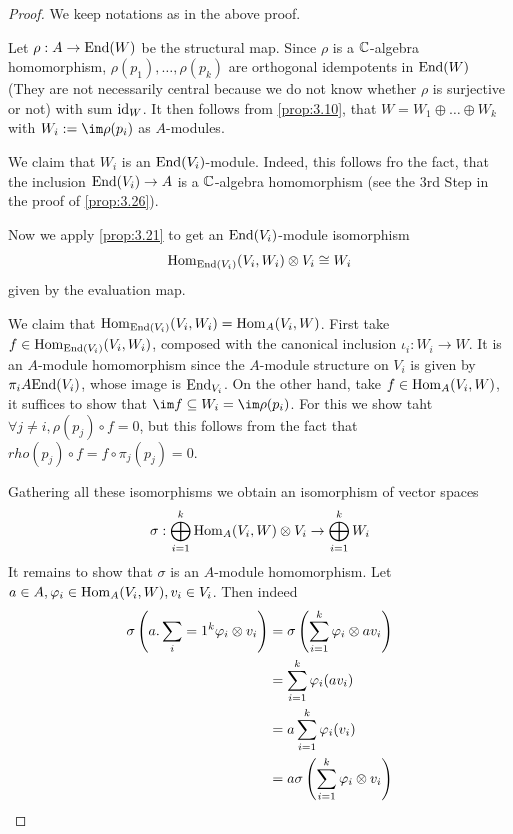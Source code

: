 \documentclass[twoside = false,	%
		headsepline,		%
		parskip = true,
		]{scrbook}						%
\begin{document}
        \begin{proof}
            We keep notations as in the above proof.

            Let $\rho:A\to\mathrm{End}(W)$ be the structural map. Since $\rho$ is a $\mathbb C$-algebra homomorphism, $\rho(p_1), \dots, \rho(p_k)$ are orthogonal idempotents in $\mathrm{End}(W)$ (They are not necessarily central because we do not know whether $\rho$ is surjective or not) with sum $\mathrm{id}_W$. It then follows from \ref{prop:3.10}, that $W=W_1 \oplus \dots \oplus W_k$ with $W_i:=\im \rho(p_i)$ as $A$-modules.

            We claim that $W_i$ is an $\mathrm{End}(V_i)$-module.
            Indeed, this follows fro the fact, that the inclusion $\mathrm{End}(V_i)\to A$ is a $\mathbb C$-algebra homomorphism (see the 3rd Step in the proof of \ref{prop:3.26}).

            Now we apply \ref{prop:3.21} to get an $\mathrm{End}(V_i)$-module isomorphism $$\mathrm{Hom}_{\mathrm{End}(V_i)}(V_i,W_i) \otimes V_i \cong W_i$$ given by the evaluation map.

            We claim that $\mathrm{Hom}_{\mathrm{End}(V_i)}(V_i,W_i) = \mathrm{Hom}_A(V_i,W)$.
            First take $f\in\mathrm{Hom}_{\mathrm{End}(V_i)}(V_i,W_i)$, composed with the canonical inclusion $\iota_i: W_i \to W$. It is an $A$-module homomorphism since the $A$-module structure on $V_i$ is given by $\pi_i A\mathrm{End}(V_i)$, whose image is $\mathrm{End}_{V_i}$.
            On the other hand, take $f\in\mathrm{Hom}_A(V_i,W)$, it suffices to show that $\im f \subseteq W_i = \im \rho(p_i)$. For this we show taht $\forall j \neq i, \rho(p_j)\circ f = 0$, but this follows from the fact that $rho(p_j)\circ f = f\circ \pi_j(p_j) = 0$.

            Gathering all these isomorphisms we obtain an isomorphism of vector spaces $$\sigma: \bigoplus_{i=1}^k \mathrm{Hom}_A(V_i,W) \otimes V_i \to \bigoplus_{i=1}^k W_i$$
            It remains to show that $\sigma$ is an $A$-module homomorphism. Let $a\in A, \varphi_i \in \mathrm{Hom}_A(V_i, W), v_i\in V_i$. Then indeed
            \begin{align*}
                \sigma\left( a.\sum_i=1^k\varphi_i\otimes v_i\right) &= \sigma\left( \sum_{i=1}^k \varphi_i \otimes av_i\right)\\
                &= \sum_{i=1}^k\varphi_i(a v_i)\\
                &= a \sum_{i=1}^k \varphi_i(v_i)\\
                &= a \sigma\left( \sum_{i=1}^k \varphi_i\otimes v_i\right)
            \end{align*}
        \end{proof}
        
\end{document}
